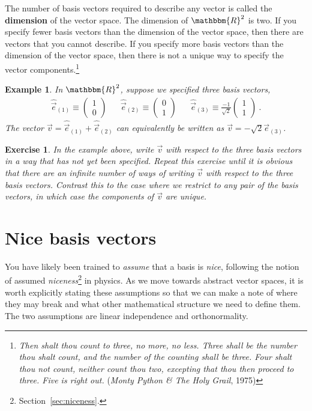 \documentclass[
  11pt,
	colorful,
	raggedright,
]{tufte-style-thesis-flip}
\newtheorem{exercise}{Exercise}[section]
\newtheorem{example}{Example}[section]
\begin{document}
The number of basis vectors required to describe any vector is called the \textbf{dimension} of the vector space. The dimension of $\mathbbm{R}^2$ is two. If you specify fewer basis vectors than the dimension of the vector space, then there are vectors that you cannot describe. If you specify more basis vectors than the dimension of the vector space, then there is not a unique way to specify the vector components.\footnote{\emph{Then shalt thou count to three, no more, no less. Three shall be the number thou shalt count, and the number of the counting shall be three. Four shalt thou not count, neither count thou two, excepting that thou then proceed to three. Five is right out.} (\emph{Monty Python \& The Holy Grail}, 1975)}
\begin{example}
In $\mathbbm{R}^2$, suppose we specified \emph{three} basis vectors,
\begin{align}
 \hat{\vec{e}}_{(1)} \equiv 
  \begin{pmatrix}
    1\\0
  \end{pmatrix}
  &&
 \hat{\vec{e}}_{(2)} \equiv 
  \begin{pmatrix}
    0\\1
  \end{pmatrix} 
  &&
 \hat{\vec{e}}_{(3)} \equiv 
  \frac{-1}{\sqrt{2}}
  \begin{pmatrix}
    1\\1
  \end{pmatrix}
  \ .
\end{align}
The vector $\vec{v} =\hat{\vec{e}}_{(1)} +\hat{\vec{e}}_{(2)}$ can equivalently be written as $\vec{v} = -\sqrt{2}\vec{e}_{(3)}$.
\end{example}
\begin{exercise}
In the example above, write $\vec{v}$ with respect to the three basis vectors in a way that has not yet been specified. Repeat this exercise until it is obvious that there are an infinite number of ways of writing $\vec{v}$ with respect to the three basis vectors. Contrast this to the case where we restrict to any pair of the basis vectors, in which case the components of $\vec{v}$ are unique.
\end{exercise}

\section{Nice basis vectors}
\label{sec:nice:basis}

You have likely been trained to \emph{assume} that a basis is \emph{nice}, following the notion of assumed \emph{niceness}\footnote{Section~\ref{sec:niceness}.} in physics. As we move towards abstract vector spaces, it is worth explicitly stating these assumptions so that we can make a note of where they may break and what other mathematical structure we need to define them. The two assumptions are linear independence and orthonormality.
\end{document}
